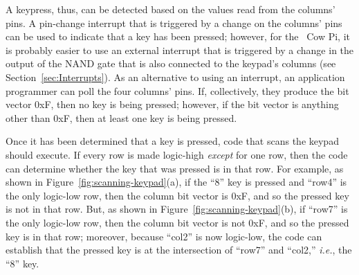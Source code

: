 A keypress, thus, can be detected based on the values read from the columns' pins.
A pin-change interrupt that is triggered by a change on the columns' pins can be used to indicate that a key has been pressed;
however, for the \hardwareversion~Cow Pi, it is probably easier to use an external interrupt that is triggered by a change in the output of the NAND gate that is also connected to the keypad's columns (see Section~\ref{sec:Interrupts}).
As an alternative to using an interrupt, an application programmer can poll the four columns' pins.
If, collectively, they produce the bit vector 0xF, then no key is being pressed;
however, if the bit vector is anything other than 0xF, then at least one key is being pressed.

Once it has been determined that a key is pressed, code that scans the keypad should execute.
If every row is made logic-high \textit{except} for one row, then the code can determine whether the key that was pressed is in that row.
For example, as shown in Figure~\ref{fig:scanning-keypad}(a), if the ``8'' key is pressed and ``row4'' is the only logic-low row, then the column bit vector is 0xF, and so the pressed key is not in that row.
But, as shown in Figure~\ref{fig:scanning-keypad}(b), if ``row7'' is the only logic-low row, then the column bit vector is not 0xF, and so the pressed key is in that row;
moreover, because ``col2'' is now logic-low, the code can establish that the pressed key is at the intersection of ``row7'' and ``col2,'' \textit{i.e.}, the ``8'' key.

